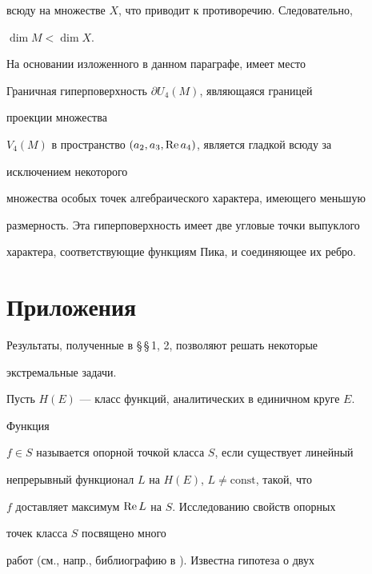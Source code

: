 всюду на множестве $X$, что приводит к противоречию. Следовательно,


$\dim M<\dim X$.





На основании изложенного в данном параграфе, имеет место





\begin{thm}


Граничная гиперповерхность $\partial U_4(M)$, являющаяся границей


проекции множества


$V_4(M)$ в пространство $(a_2,a_3,\operatorname{Re} a_4)$, является гладкой всюду за


исключением некоторого


множества особых точек алгебраического характера, имеющего меньшую


размерность. Эта гиперповерхность имеет две угловые точки выпуклого


характера, соответствующие функциям Пика, и соединяющее их ребро.


\end{thm}





\section{Приложения}





Результаты, полученные в \S\,\S\,1, 2, позволяют решать некоторые


экстремальные задачи.





Пусть $H(E)$ --- класс функций, аналитических в единичном круге $E$.


Функция


$f\in S$ называется опорной точкой класса $S$, если существует линейный


непрерывный функционал $L$ на $H(E)$, $L\ne\text{const}$, такой, что


$f$ доставляет максимум $\operatorname{Re} L$ на $S$. Исследованию свойств опорных


точек класса $S$ посвящено много


работ (см., напр., библиографию в \cite{5}). Известна гипотеза о двух


